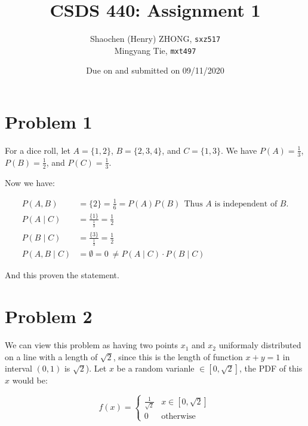 \documentclass[12pt]{article}
\newcommand{\ilcode}{\texttt}
\begin{document}
\title{\textbf{CSDS 440: Assignment 1}}

\author{Shaochen (Henry) ZHONG, \ilcode{sxz517} \\ Mingyang Tie, \ilcode{mxt497}}
\date{Due on and submitted on 09/11/2020}
\maketitle


\section{Problem 1}

For a dice roll, let $A = \{1, 2\}$, $B = \{2, 3, 4\}$, and $C = \{1, 3\}$. We have  $P(A) = \frac{1}{3}$, $P(B) = \frac{1}{2}$, and $P(C) = \frac{1}{3}$.

Now we have:

\begin{align*}
    P(A, B) &= \{2\} = \frac{1}{6} = P(A)P(B) \ \ \text{Thus $A$ is independent of $B$.} \\
    P(A \mid C) &= \frac{ \{1\} }{\frac{1}{3}} = \frac{1}{2} \\
    P(B \mid C) &= \frac{ \{3\} }{\frac{1}{3}} = \frac{1}{2} \\
    P(A, B \mid C) &= \emptyset = 0 \ \neq P(A \mid C) \cdot P(B \mid C)
\end{align*}

And this proven the statement.

\section{Problem 2}

We can view this problem as having two points $x_1$ and $x_2$ uniformaly distributed on a line with a length of $\sqrt{2}$, since this is the length of function $x+y = 1$ in interval $(0, 1)$ is $\sqrt{2}$). Let $x$ be a random varianle $\in[0, \sqrt{2}]$, the PDF of this $x$ would be:

\[ f(x) = \begin{cases}
      \frac{1}{\sqrt{2}} & x \in [0, \sqrt{2}]\\
      0 & \text{otherwise}
   \end{cases}
\]
\end{document}
